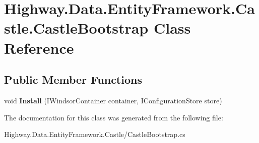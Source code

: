 \hypertarget{class_highway_1_1_data_1_1_entity_framework_1_1_castle_1_1_castle_bootstrap}{\section{Highway.\-Data.\-Entity\-Framework.\-Castle.\-Castle\-Bootstrap Class Reference}
\label{class_highway_1_1_data_1_1_entity_framework_1_1_castle_1_1_castle_bootstrap}
}
\subsection*{Public Member Functions}
\begin{DoxyCompactItemize}
\item 
\hypertarget{class_highway_1_1_data_1_1_entity_framework_1_1_castle_1_1_castle_bootstrap_ac7161bb3c873e78b28b4085225c5a776}{void {\bfseries Install} (I\-Windsor\-Container container, I\-Configuration\-Store store)}\label{class_highway_1_1_data_1_1_entity_framework_1_1_castle_1_1_castle_bootstrap_ac7161bb3c873e78b28b4085225c5a776}

\end{DoxyCompactItemize}


The documentation for this class was generated from the following file\-:\begin{DoxyCompactItemize}
\item 
Highway.\-Data.\-Entity\-Framework.\-Castle/Castle\-Bootstrap.\-cs\end{DoxyCompactItemize}
